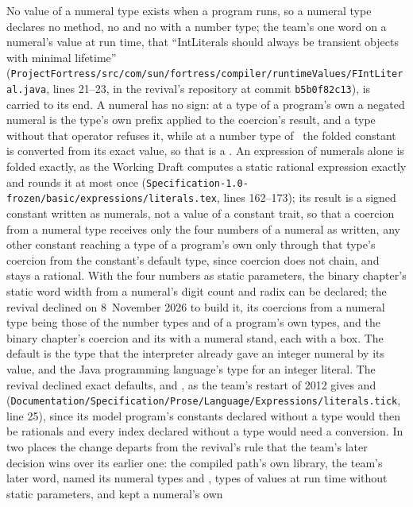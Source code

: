 \begin{description}
No value of a numeral type exists when a program runs, so a numeral type declares
no method, no  and no \EXP{=} with a number type; the team's one
word on a numeral's value at run time, that ``IntLiterals should always be
transient objects with minimal lifetime''
(\nolinkurl{ProjectFortress/src/com/sun/fortress/compiler/runtimeValues/FIntLiteral.java},
lines 21--23, in the revival's repository at commit \texttt{b5b0f82c13}), is
carried to its end.
A numeral has no sign: at a type of a program's own a negated numeral is the
type's own prefix \EXP{-} applied to the coercion's result, and a type without
that operator refuses it, while at a number type of \library\ the folded
constant is converted from its exact value, so that  is a
.
An expression of numerals alone is folded exactly, as the Working Draft computes
a static rational expression exactly and rounds it at most once
(\nolinkurl{Specification-1.0-frozen/basic/expressions/literals.tex}, lines
162--173); its result is a signed constant written as numerals, not a value of a
constant trait, so that a coercion from a numeral type receives only the four
numbers of a numeral as written, any other constant reaching a type of a
program's own only through that type's coercion from the constant's default
type, since coercion does not chain, and  stays a rational.
With the four numbers as static parameters, the binary chapter's static word
width from a numeral's digit count and radix can be declared; the revival
declined on 8~November 2026 to build it, its coercions from a numeral type being
those of the number types and of a program's own types, and the binary chapter's
coercion and its \EXP{\|} with a numeral stand, each with a box.
The default is the type that the interpreter already gave an integer numeral by
its value, and the Java programming language's type for an integer literal.
The revival declined exact defaults,  and , as
the team's restart of 2012 gives  and 
(\nolinkurl{Documentation/Specification/Prose/Language/Expressions/literals.tick},
line 25), since its model program's constants declared without a type would then
be rationals and every index declared without a type would need a conversion.
In two places the change departs from the revival's rule that the team's later
decision wins over its earlier one: the compiled path's own library, the team's
later word, named its numeral types  and ,
types of values at run time without static parameters, and kept a numeral's own

\end{description}
